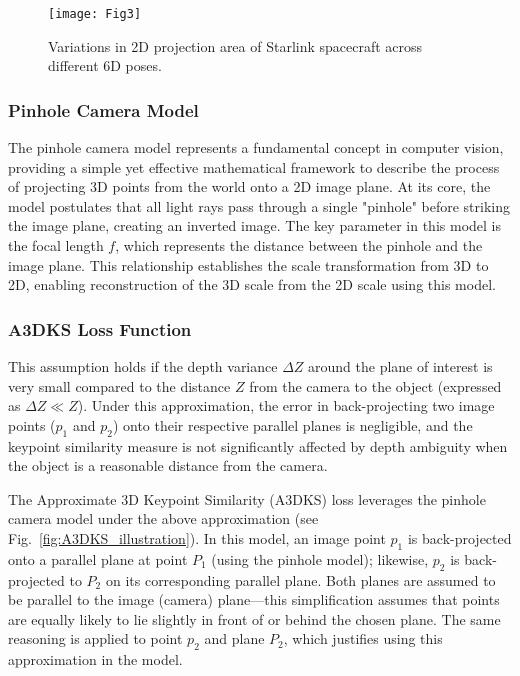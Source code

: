 \documentclass[a4paper,fleqn]{cas-sc}
\begin{document}
\begin{figure}[!htbp]
	\centering
	\texttt{[image: Fig3]} 
	\caption{Variations in 2D projection area of Starlink spacecraft across different 6D poses.}
	\label{fig:Obj_Proj1}
\end{figure}

\subsubsection{Pinhole Camera Model}
The pinhole camera model represents a fundamental concept in computer vision, providing a simple yet effective mathematical framework to describe the process of projecting 3D points from the world onto a 2D image plane. At its core, the model postulates that all light rays pass through a single "pinhole" before striking the image plane, creating an inverted image. The key parameter in this model is the focal length $f$, which represents the distance between the pinhole and the image plane. This relationship establishes the scale transformation from 3D to 2D, enabling reconstruction of the 3D scale from the 2D scale using this model.

\subsubsection{A3DKS Loss Function}
This assumption holds if the depth variance $\Delta Z$ around the plane of interest is very small compared to the distance $Z$ from the camera to the object (expressed as $\Delta Z \ll Z$). Under this approximation, the error in back-projecting two image points ($p_1$ and $p_2$) onto their respective parallel planes is negligible, and the keypoint similarity measure is not significantly affected by depth ambiguity when the object is a reasonable distance from the camera.

The Approximate 3D Keypoint Similarity (A3DKS) loss leverages the pinhole camera model under the above approximation (see Fig.~\ref{fig:A3DKS_illustration}). In this model, an image point $p_1$ is back-projected onto a parallel plane at point $P_1$ (using the pinhole model); likewise, $p_2$ is back-projected to $P_2$ on its corresponding parallel plane. Both planes are assumed to be parallel to the image (camera) plane—this simplification assumes that points are equally likely to lie slightly in front of or behind the chosen plane. The same reasoning is applied to point $p_2$ and plane $P_2$, which justifies using this approximation in the model.
\end{document}
